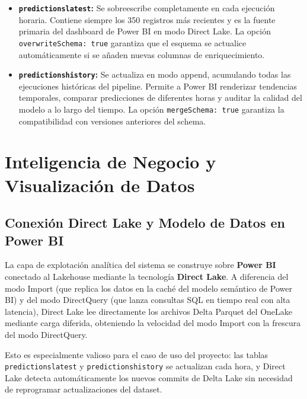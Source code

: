\documentclass[12pt,oneside,a4paper]{report}
\renewcommand{\_}{\textunderscore\allowbreak}
\begin{document}
\begin{itemize}
    \item \textbf{\texttt{predictions\_latest}:} Se sobreescribe completamente en cada ejecución horaria. Contiene siempre los 350 registros más recientes y es la fuente primaria del dashboard de Power BI en modo Direct Lake. La opción \texttt{overwriteSchema: true} garantiza que el esquema se actualice automáticamente si se añaden nuevas columnas de enriquecimiento.
    \item \textbf{\texttt{predictions\_history}:} Se actualiza en modo append, acumulando todas las ejecuciones históricas del pipeline. Permite a Power BI renderizar tendencias temporales, comparar predicciones de diferentes horas y auditar la calidad del modelo a lo largo del tiempo. La opción \texttt{mergeSchema: true} garantiza la compatibilidad con versiones anteriores del schema.
\end{itemize}

\chapter{Inteligencia de Negocio y Visualización de Datos}
\label{cap:visualizacion}

\section{Conexión Direct Lake y Modelo de Datos en Power BI}
\label{sec:direct_lake}

La capa de explotación analítica del sistema se construye sobre \textbf{Power BI} conectado al Lakehouse mediante la tecnología \textbf{Direct Lake}. A diferencia del modo Import (que replica los datos en la caché del modelo semántico de Power BI) y del modo DirectQuery (que lanza consultas SQL en tiempo real con alta latencia), Direct Lake lee directamente los archivos Delta Parquet del OneLake mediante carga diferida, obteniendo la velocidad del modo Import con la frescura del modo DirectQuery.

Esto es especialmente valioso para el caso de uso del proyecto: las tablas \texttt{predictions\_latest} y \texttt{predictions\_history} se actualizan cada hora, y Direct Lake detecta automáticamente los nuevos commits de Delta Lake sin necesidad de reprogramar actualizaciones del dataset.
\end{document}

